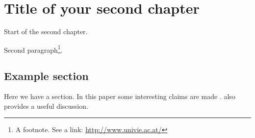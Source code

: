 \chapter{Title of your second chapter}
\label{ch:second}

\noindent
Start of the second chapter.

Second paragraph\footnote{A footnote. See a link: \url{http://www.univie.ac.at/}}.
 
\section{Example section}
\label{sec:testsubsect}

Here we have a section. In this paper some interesting claims are made \parencite{tooby92}. \textcite{bandura90} also provides a useful discussion.